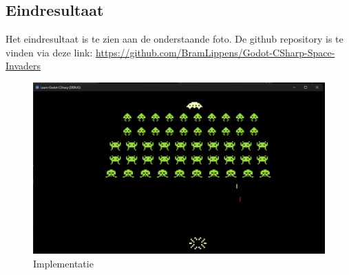 \subsection{Eindresultaat}
Het eindresultaat is te zien aan de onderstaande foto. De github repository is te vinden via deze link: \url{https://github.com/BramLippens/Godot-CSharp-Space-Invaders}
\begin{figure}[H]
    \centering
    \includegraphics[width=1\textwidth]{ImplementatieSpel.png}
    \caption{Implementatie}
    \label{fig:POC}
\end{figure}

